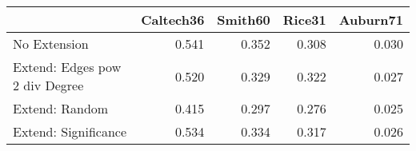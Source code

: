 \begin{tabular}{lrrrr}
\toprule
{} & Caltech36 & Smith60 & Rice31 & Auburn71 \\
\midrule
No Extension                   &     0.541 &   0.352 &  0.308 &    0.030 \\
Extend: Edges pow 2 div Degree &     0.520 &   0.329 &  0.322 &    0.027 \\
Extend: Random                 &     0.415 &   0.297 &  0.276 &    0.025 \\
Extend: Significance           &     0.534 &   0.334 &  0.317 &    0.026 \\
\bottomrule
\end{tabular}

